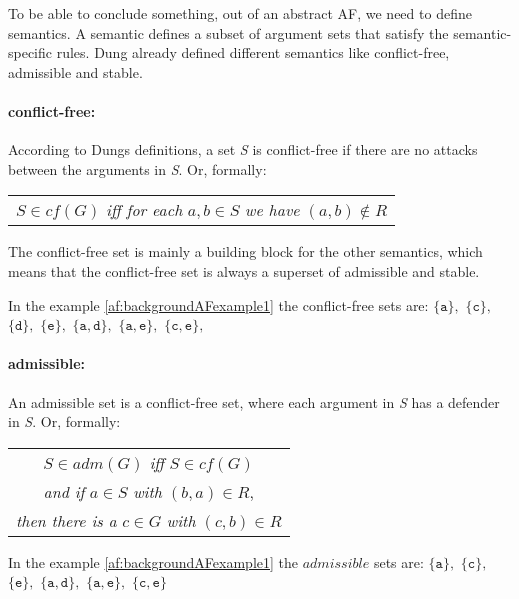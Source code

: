 To be able to conclude something, out of an abstract AF, we need to define semantics. A semantic defines a subset of argument sets that satisfy the semantic-specific rules. Dung already defined different semantics \cite{Dung1995-DUNOTA-2} like conflict-free, admissible and stable.

\paragraph{conflict-free:} According to Dungs definitions, a set \textit{S} is conflict-free if there are no attacks between the arguments in \textit{S}. Or, formally:

\begin{center}
    \begin{tabular}{c}
        $S \in cf(G)$ \textit{iff for each} $a, b \in S$ \textit{we have} $(a, b) \not\in R$
    \end{tabular}
\end{center}

The conflict-free set is mainly a building block for the other semantics, which means that the conflict-free set is always a superset of admissible and stable.

In the example \ref{af:backgroundAFexample1} the conflict-free sets are:
$\mathtt{\{a\}},$
$\mathtt{\{c\}},$
$\mathtt{\{d\}},$
$\mathtt{\{e\}},$
$\mathtt{\{a, d\}},$
$\mathtt{\{a, e\}},$
$\mathtt{\{c, e\}},$

\paragraph{admissible:} An admissible set is a conflict-free set, where each argument in \textit{S} has a defender in \textit{S}. Or, formally:

\begin{center}
    \begin{tabular}{c}
        $S \in adm(G)$ \textit{iff} $S \in cf(G)$\\

        \textit{and if} $a \in S$ \textit{with} $(b, a) \in R$,\\

        \textit{then there is a} $c \in G$ \textit{with} $(c, b) \in R$
    \end{tabular}
\end{center}

In the example \ref{af:backgroundAFexample1} the $admissible$ sets are:
$\mathtt{\{a\}},$
$\mathtt{\{c\}},$
$\mathtt{\{e\}},$
$\mathtt{\{a, d\}},$
$\mathtt{\{a, e\}},$
$\mathtt{\{c, e\}}$


